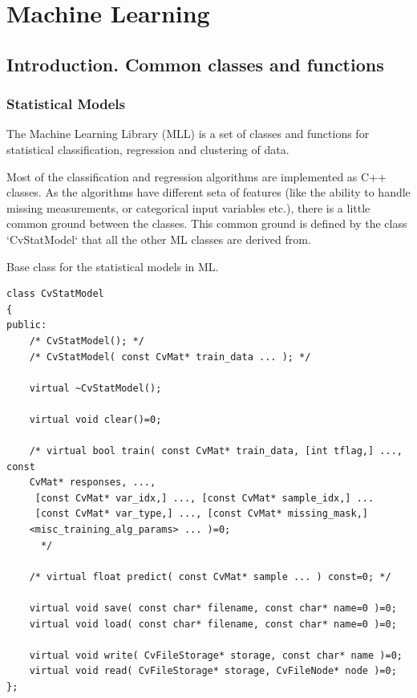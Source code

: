 \chapter{Machine Learning}

\section{Introduction. Common classes and functions}

\subsection{Statistical Models}

The Machine Learning Library (MLL) is a set of classes and functions for statistical classification, regression and clustering of data.

Most of the classification and regression algorithms are implemented as C++ classes. As the algorithms have different seta of features (like the ability to handle missing measurements, or categorical input variables etc.), there is a little common ground between the classes. This common ground is defined by the class `CvStatModel` that all the other ML classes are derived from.



Base class for the statistical models in ML.

\begin{lstlisting}
class CvStatModel
{
public:
    /* CvStatModel(); */
    /* CvStatModel( const CvMat* train_data ... ); */

    virtual ~CvStatModel();

    virtual void clear()=0;

    /* virtual bool train( const CvMat* train_data, [int tflag,] ..., const 
	CvMat* responses, ...,
     [const CvMat* var_idx,] ..., [const CvMat* sample_idx,] ...
     [const CvMat* var_type,] ..., [const CvMat* missing_mask,] 
	<misc_training_alg_params> ... )=0;
      */

    /* virtual float predict( const CvMat* sample ... ) const=0; */

    virtual void save( const char* filename, const char* name=0 )=0;
    virtual void load( const char* filename, const char* name=0 )=0;

    virtual void write( CvFileStorage* storage, const char* name )=0;
    virtual void read( CvFileStorage* storage, CvFileNode* node )=0;
};
\end{lstlisting}

